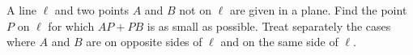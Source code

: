 A line $\ell$ and two points $A$ and $B$ not on $\ell$ are given in a plane. Find the point $P$ on $\ell$ for which $AP+PB$ is as small as possible. Treat separately the cases where $A$ and $B$ are on opposite sides of $\ell$ and on the same side of $\ell$.
